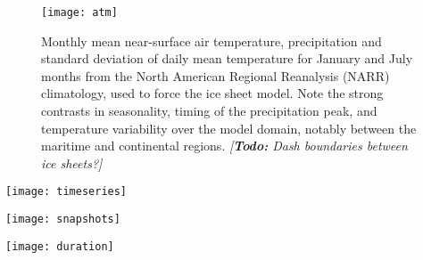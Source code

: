 \documentclass[tc, manuscript]{copernicus}
\newcommand{\todo}[1]{\emph{[\textbf{Todo:} #1]}}
\begin{document}
\begin{figure}
  \texttt{[image: atm]}
  \caption{Monthly mean near-surface air temperature, precipitation and
           standard deviation of daily mean temperature for January and July
           months from the North American Regional Reanalysis (NARR)
           climatology, used to force the ice sheet model. Note the
           strong contrasts in seasonality, timing of the precipitation peak,
           and temperature variability over the model domain, notably between
           the maritime and continental regions.
           \todo{Dash boundaries between ice sheets?}}
  \label{fig:atm}
\end{figure}

\begin{figure*}
  \texttt{[image: timeseries]}
  \caption{Temperature offset time-series from ice core and sediment core
           records (Table~\ref{tab:records}) used as palaeo-climate forcing for
           the ice sheet model \textbf{(top)}, and modelled ice volume
           through the last 120\,kyr, expressed in meters of sea-level
           equivalent \textbf{(bottom)}. Gray spans indicate Marine Isotope
           Stages (MIS) according to a global compilation of benthic
            records \citep{Lisiecki.Raymo.2005}. Hatched
           rectangles highlight modelled ice volume extrema corresponding to
           MIS~4 (61.9--55.4\,kyr), MIS~3 (52.2--45.6\,kyr), and
           MIS~2 (last glacial maximum, 29.5--16.9\,kyr). Dotted lines
           correspond to the GRIP and EPICA 6\,km-resolution runs.}
  \label{fig:timeseries}
\end{figure*}

\begin{figure*}
  \texttt{[image: snapshots]}
  \caption{Snapshots of modelled surface topography (500\,m contours)
           corresponding to the ice volume extrema indicated on
           Fig.~\ref{fig:timeseries}. Note the occurence of spatial similarities
           despite large differences in timing.
           \todo{Perhaps indicate the location of the Skeena Mountains.}}
  \label{fig:snapshots}
\end{figure*}

\begin{figure*}
  \texttt{[image: duration]}
  \caption{Modelled duration of ice cover during the last 120\,kyr.
           Note the irregular colour scale. A contiguous ice cover spanning
           from the Alaska Range (AR) to the southern Coast Mountains (CM) and
           Rocky Mountains (RM) exists for about 29\,kyr in both
           simulations. A central
           ice cover persists over the Skeena Mountains (SM) during most of the
           simulation. On the other hand, the maximal extent of the ice sheet
           generally corresponds to relatively short durations of ice cover.}
  \label{fig:duration}
\end{figure*}
\end{document}
